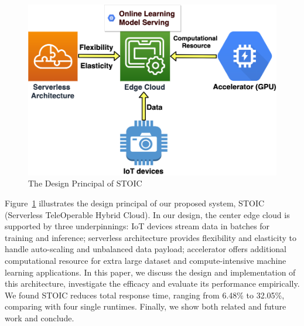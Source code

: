 \begin{figure}
    \centering
    \includegraphics[scale=0.27]{figures/edge}
    \caption{The Design Principal of STOIC }
    \label{fig:edge}
\end{figure}

Figure~\ref{fig:edge} illustrates the design principal of our proposed system, STOIC (Serverless TeleOperable Hybrid Cloud). In our design, the center edge cloud is supported by three underpinnings: IoT devices stream data in batches for training and inference; serverless architecture provides flexibility and elasticity to handle auto-scaling and unbalanced data payload; accelerator offers additional computational resource for extra large dataset and compute-intensive machine learning applications. In this paper, we discuss the design and implementation of this architecture, investigate the efficacy and evaluate its performance empirically. We found STOIC reduces total response time, ranging from 6.48\% to 32.05\%, comparing with four single runtimes. Finally, we show both related and future work and conclude.
